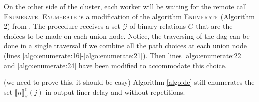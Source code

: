 On the other side of the cluster, each worker will be waiting for the remote call \textsc{Enumerate}. \textsc{Enumerate} is a modification of the algorithm \textsc{Enumerate} (Algorithm 2) from \cite{core}. The procedure receives a set $\mathcal{G}$ of binary relations $G$ that are the choices to be made on each union node. Notice, the traversing of the \gls{dag} can be done in a single traversal if we combine all the path choices at each union node (lines \ref{algo:enumerate:16}-\ref{algo:enumerate:21}). Then lines \ref{algo:enumerate:22} and \ref{algo:enumerate:24} have been modified to accommodate this choice.

(we need to prove this, it should be easy) Algorithm \ref{algo:de} still enumerates the set ${\llbracket n \rrbracket}^{\epsilon}_{\mathcal{E}}(j)$ in output-liner delay and without repetitions.
